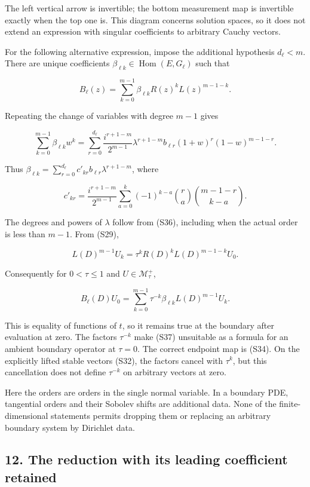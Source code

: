 \documentclass[
  11pt,
]{article}
\begin{document}
The left vertical arrow is invertible; the bottom measurement map is
invertible exactly when the top one is. This diagram concerns solution
spaces, so it does not extend an expression with singular coefficients
to arbitrary Cauchy vectors.

For the following alternative expression, impose the additional
hypothesis \(d_\ell<m\). There are unique coefficients
\(\beta_{\ell k}\in\operatorname{Hom}(E,G_\ell)\) such that

\[
B_\ell(z)=\sum_{k=0}^{m-1}
\beta_{\ell k}R(z)^kL(z)^{m-1-k}.                         \tag{S35}
\]

Repeating the change of variables with degree \(m-1\) gives

\[
\sum_{k=0}^{m-1}\beta_{\ell k}w^k
=\sum_{r=0}^{d_\ell}
\frac{i^{r+1-m}}{2^{m-1}}\lambda^{r+1-m}
b_{\ell r}(1+w)^r(1-w)^{m-1-r}.                          \tag{S36}
\]

Thus
\(\beta_{\ell k}=\sum_{r=0}^{d_\ell}c'_{kr}b_{\ell r}\lambda^{r+1-m}\),
where

\[
c'_{kr}=\frac{i^{r+1-m}}{2^{m-1}}
\sum_{a=0}^k(-1)^{k-a}
\binom{r}{a}\binom{m-1-r}{k-a}.
\]

The degrees and powers of \(\lambda\) follow from (S36), including when
the actual order is less than \(m-1\). From (S29),

\[
L(D)^{m-1}U_k
=\tau^kR(D)^kL(D)^{m-1-k}U_0.
\]

Consequently for \(0<\tau\leq1\) and \(U\in\mathcal M^+_\tau\),

\[
B_\ell(D)U_0
=\sum_{k=0}^{m-1}\tau^{-k}\beta_{\ell k}
L(D)^{m-1}U_k.                                          \tag{S37}
\]

This is equality of functions of \(t\), so it remains true at the
boundary after evaluation at zero. The factors \(\tau^{-k}\) make (S37)
unsuitable as a formula for an ambient boundary operator at \(\tau=0\).
The correct endpoint map is (S34). On the explicitly lifted stable
vectors (S32), the factors cancel with \(\tau^k\), but this cancellation
does not define \(\tau^{-k}\) on arbitrary vectors at zero.

Here the orders are orders in the single normal variable. In a boundary
PDE, tangential orders and their Sobolev shifts are additional data.
None of the finite-dimensional statements permits dropping them or
replacing an arbitrary boundary system by Dirichlet data.

\subsection{12. The reduction with its leading coefficient
retained}\label{the-reduction-with-its-leading-coefficient-retained}
\end{document}
